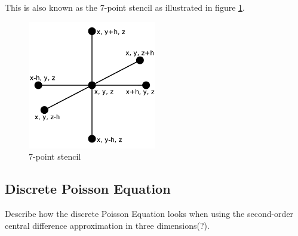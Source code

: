 This is also known as the 7-point stencil as illustrated in figure \ref{7ps}.

\begin{figure}[h]
	\center
	\includegraphics[width=0.5\textwidth]{images/7_point_stencil}
	\caption{7-point stencil}
	\label{7ps}
\end{figure}


\subsection*{Discrete Poisson Equation}

Describe how the discrete Poisson Equation looks when using the second-order central 
difference approximation in three dimensions(?).

